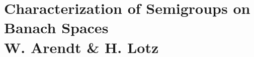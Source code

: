 
\chapter{Characterization of Semigroups on Banach Spaces\\
W. Arendt \& H. Lotz}\label{chap:A-II}

%
%
%
%
%
%
%
